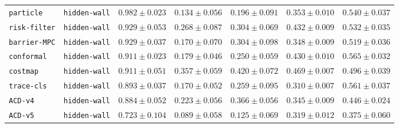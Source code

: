 \documentclass{article}
\begin{document}
\begin{center}
{\begin{tabular}{llccccc}
\texttt{particle} & \texttt{hidden-wall} & $0.982 \pm 0.023$ & $0.134 \pm 0.056$ & $0.196 \pm 0.091$ & $0.353 \pm 0.010$ & $0.540 \pm 0.037$ \\
\texttt{risk-filter} & \texttt{hidden-wall} & $0.929 \pm 0.053$ & $0.268 \pm 0.087$ & $0.304 \pm 0.069$ & $0.432 \pm 0.009$ & $0.532 \pm 0.035$ \\
\texttt{barrier-MPC} & \texttt{hidden-wall} & $0.929 \pm 0.037$ & $0.170 \pm 0.070$ & $0.304 \pm 0.098$ & $0.348 \pm 0.009$ & $0.519 \pm 0.036$ \\
\texttt{conformal} & \texttt{hidden-wall} & $0.911 \pm 0.023$ & $0.179 \pm 0.046$ & $0.250 \pm 0.059$ & $0.430 \pm 0.010$ & $0.565 \pm 0.032$ \\
\texttt{costmap} & \texttt{hidden-wall} & $0.911 \pm 0.051$ & $0.357 \pm 0.059$ & $0.420 \pm 0.072$ & $0.469 \pm 0.007$ & $0.496 \pm 0.039$ \\
\texttt{trace-cls} & \texttt{hidden-wall} & $0.893 \pm 0.037$ & $0.170 \pm 0.052$ & $0.259 \pm 0.095$ & $0.310 \pm 0.007$ & $0.561 \pm 0.037$ \\
\texttt{ACD-v4} & \texttt{hidden-wall} & $0.884 \pm 0.052$ & $0.223 \pm 0.056$ & $0.366 \pm 0.056$ & $0.345 \pm 0.009$ & $0.446 \pm 0.024$ \\
\texttt{ACD-v5} & \texttt{hidden-wall} & $0.723 \pm 0.104$ & $0.089 \pm 0.058$ & $0.125 \pm 0.069$ & $0.319 \pm 0.012$ & $0.375 \pm 0.060$ \\
\bottomrule
\end{tabular}%
}
\end{center}
\end{document}
